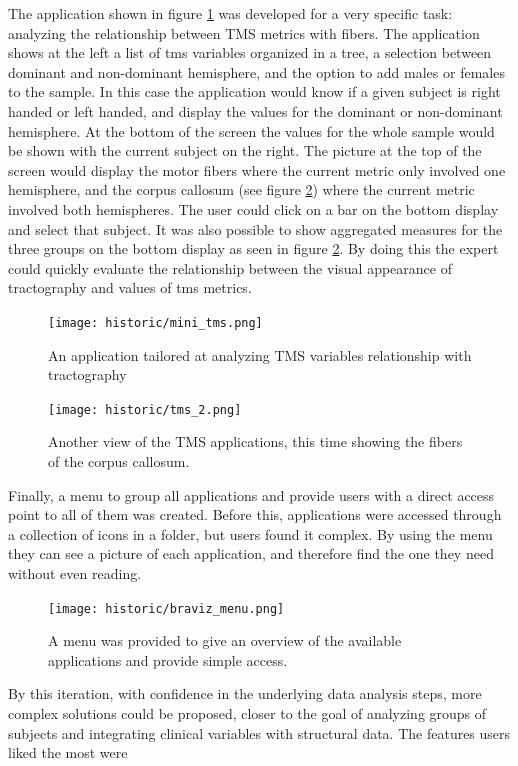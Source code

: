 The application shown in figure \ref{fig_tms_1} was developed for a very specific task: analyzing the relationship between TMS metrics with fibers. The application shows at the left a list of tms variables organized in a tree, a selection between dominant and non-dominant hemisphere, and the option to add males or females to the sample. In this case the application would know if a given subject is right handed or left handed, and display the values for the dominant or non-dominant hemisphere. At the bottom of the screen the values for the whole sample would be shown with the current subject on the right. The picture at the top of the screen would display the motor fibers where the current metric only involved one hemisphere, and the corpus callosum (see figure \ref{fig_tms_2}) where the current metric involved both hemispheres. The user could click on a bar on the bottom display and select that subject.
It was also possible to show aggregated measures for the three groups on the bottom display as seen in figure  \ref{fig_tms_2}. By doing this the expert could quickly evaluate the relationship between the visual appearance of tractography and values of tms metrics.

\begin{figure}
\centering
\texttt{[image: historic/mini\_tms.png]}
\caption{\label{fig_tms_1}An application tailored at analyzing TMS variables relationship with tractography}
\end{figure}

\begin{figure}
\centering
\texttt{[image: historic/tms\_2.png]}
\caption{\label{fig_tms_2}Another view of the TMS applications, this time showing the fibers of the corpus callosum.}
\end{figure}

Finally, a menu to group all applications and provide users with a direct access point to all of them was created. Before this, applications were accessed through a collection of icons in a folder, but users found it complex. By using the menu they can see a picture of each application, and therefore find the one they need without even reading.

\begin{figure}
\centering
\texttt{[image: historic/braviz\_menu.png]}
\caption{\label{fig_menu_1}A menu was provided to give an overview of the available applications and provide simple access.}
\end{figure}

By this iteration, with confidence in the underlying data analysis steps, more complex solutions could be proposed, closer to the goal of analyzing groups of subjects and integrating clinical variables with structural data. The features users liked the most were

